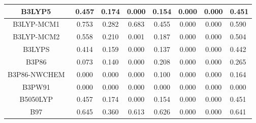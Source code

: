 \begin{tabular}{|c|c|c|c|c|c|c|l|}
                                 B3LYP5~\cite{Stephens1994_11623} &                0.457 &                          0.174 &             0.000 &                        0.154 &                0.000 &                0.000 &                       0.451 \\ \hline
                                B3LYP-MCM1~\cite{Caldeira2019_62} &                0.753 &                          0.282 &             0.683 &                        0.455 &                0.000 &                0.000 &                       0.590 \\ \hline
                                B3LYP-MCM2~\cite{Caldeira2019_62} &                0.558 &                          0.210 &             0.001 &                        0.187 &                0.000 &                0.000 &                       0.504 \\ \hline
                                      B3LYPS~\cite{Reiher2001_48} &                0.414 &                          0.159 &             0.000 &                        0.137 &                0.000 &                0.000 &                       0.442 \\ \hline
                              B3P86~\cite{gaussianimplementation} &                0.073 &                          0.140 &             0.000 &                        0.208 &                0.000 &                0.000 &                       0.265 \\ \hline
                         B3P86-NWCHEM~\cite{nwchemimplementation} &                0.000 &                          0.000 &             0.000 &                        0.100 &                0.000 &                0.000 &                       0.164 \\ \hline
                                     B3PW91~\cite{Becke1993_5648} &                0.000 &                          0.000 &             0.000 &                        0.000 &                0.000 &                0.000 &                       0.000 \\ \hline
                                    B5050LYP~\cite{Shao2003_4807} &                0.457 &                          0.174 &             0.000 &                        0.154 &                0.000 &                0.000 &                       0.451 \\ \hline
                                        B97~\cite{Becke1997_8554} &                0.645 &                          0.360 &             0.613 &                        0.626 &                0.000 &                0.000 &                       0.641 \\ \hline

\end{tabular}
